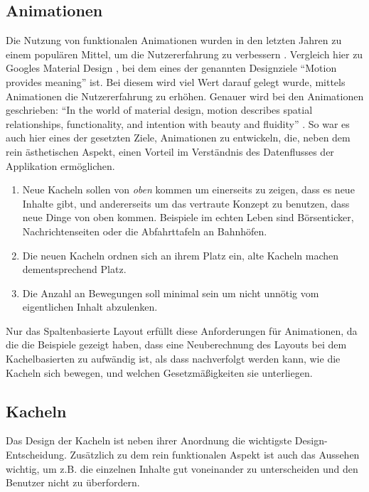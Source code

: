 \documentclass[12pt,twoside]{book}
\begin{document}
\subsection{Animationen}

Die Nutzung von funktionalen Animationen wurden in den letzten Jahren zu einem populären Mittel, um die Nutzererfahrung zu verbessern \cite{functionalanimations}. Vergleich hier zu Googles Material Design \cite{materialdesign}, bei dem eines der genannten Designziele ``Motion provides meaning'' ist. Bei diesem wird viel Wert darauf gelegt wurde, mittels Animationen die Nutzererfahrung zu erhöhen. Genauer wird bei den Animationen geschrieben: ``In the world of material design, motion describes spatial relationships, functionality, and intention with beauty and fluidity'' \cite{materialdesign}.
So war es auch hier eines der gesetzten Ziele, Animationen zu entwickeln, die, neben dem rein ästhetischen Aspekt, einen Vorteil im Verständnis des Datenflusses der Applikation ermöglichen.

\begin{enumerate}
  \item Neue Kacheln sollen von \textit{oben} kommen um einerseits zu zeigen, dass es neue Inhalte gibt, und andererseits um das vertraute Konzept zu benutzen, dass neue Dinge von oben kommen. Beispiele im echten Leben sind Börsenticker, Nachrichtenseiten oder die Abfahrttafeln an Bahnhöfen.

  \item Die neuen Kacheln ordnen sich an ihrem Platz ein, alte Kacheln machen dementsprechend Platz.
  \item Die Anzahl an Bewegungen soll minimal sein um nicht unnötig vom eigentlichen Inhalt abzulenken.
\end{enumerate}

Nur das Spaltenbasierte Layout erfüllt diese Anforderungen für Animationen, da die die Beispiele gezeigt haben, dass eine Neuberechnung des Layouts bei dem Kachelbasierten zu aufwändig ist, als dass nachverfolgt werden kann, wie die Kacheln sich bewegen, und welchen Gesetzmäßigkeiten sie unterliegen.

\subsection{Kacheln}\label{sec:tiles}

Das Design der Kacheln ist neben ihrer Anordnung die wichtigste Design-Entscheidung. Zusätzlich zu dem rein funktionalen Aspekt ist auch das Aussehen wichtig, um z.B. die einzelnen Inhalte gut voneinander zu unterscheiden und den Benutzer nicht zu überfordern.
\end{document}
